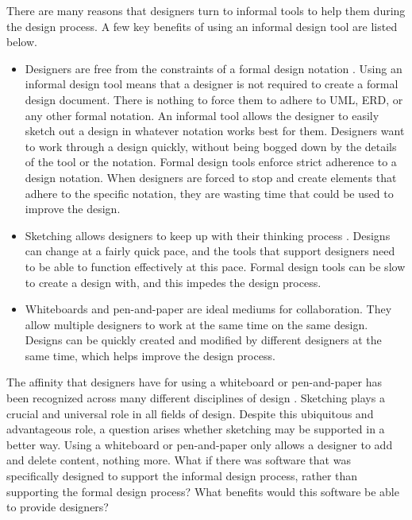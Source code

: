There are many reasons that designers turn to informal tools to help them during the design process. 
A few key benefits of using an informal design tool are listed below.
\begin{itemize}\itemsep1pt
\item 
Designers are free from the constraints of a formal design notation \cite{wong}. 
Using an informal design tool means that a designer is not required to create a formal design document. 
There is nothing to force them to adhere to UML, ERD, or any other formal notation. 
An informal tool allows the designer to easily sketch out a design in whatever notation works best for them. 
Designers want to work through a design quickly, without being bogged down by the details of the tool or the notation.
Formal design tools enforce strict adherence to a design notation.
When designers are forced to stop and create elements that adhere to the specific notation, they are wasting time that could be used to improve the design.

\item 
Sketching allows designers to keep up with their thinking process \cite{petre}. 
Designs can change at a fairly quick pace, and the tools that support designers need to be able to function effectively at this pace.
Formal design tools can be slow to create a design with, and this impedes the design process. 

\item 
Whiteboards and pen-and-paper are ideal mediums for collaboration.
They allow multiple designers to work at the same time on the same design.
Designs can be quickly created and modified by different designers at the same time, which helps improve the design process.
\end{itemize}

The affinity that designers have for using a whiteboard or pen-and-paper has been recognized across many different disciplines of design \cite{goel, cherubini}. 
Sketching plays a crucial and universal role in all fields of design. 
Despite this ubiquitous and advantageous role, a question arises whether sketching may be supported in a better way.
Using a whiteboard or pen-and-paper only allows a designer to add and delete content, nothing more.
What if there was software that was specifically designed to support the informal design process, rather than supporting the formal design process? 
What benefits would this software be able to provide designers?


